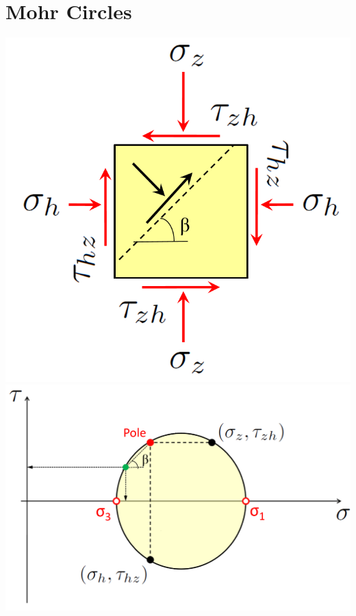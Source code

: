 \section{Mohr Circles}

    \begin{multicols}{2}
        \includegraphics[scale=0.4]{Verastegui/images/V7.PNG} \\
        \includegraphics[scale=0.4]{Verastegui/images/V8.PNG}
    \end{multicols}

